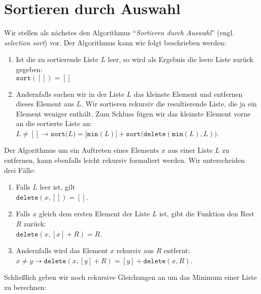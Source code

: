 \section{Sortieren durch Auswahl}
Wir stellen als n\"achstes den Algorithmus ``\emph{Sortieren durch Auswahl}''
(engl. \emph{selection sort}) vor.  Der Algorithmus kann wie folgt beschrieben werden:
\begin{enumerate}
\item Ist die zu sortierende Liste $L$ leer, so wird als Ergebnis
      die leere Liste zur\"uck gegeben: \\[0.2cm]
      \hspace*{1.3cm} $\mathtt{sort}([]) = []$
\item Andernfalls suchen wir in der Liste $L$ das kleinste Element und entfernen dieses
      Element aus $L$.  Wir sortieren rekursiv die resultierende Liste, die ja ein Element
      weniger enth\"alt.  Zum Schluss f\"ugen wir das kleinste Element vorne an die sortierte
      Liste an: \\[0.2cm]
      \hspace*{1.3cm} 
      $L \not= [] \rightarrow \mathtt{sort}\bigl(L\bigr) = \bigl[\texttt{min}(L)\bigr]
      + \mathtt{sort}\bigl(\mathtt{delete}(\texttt{min}(L), L)\bigr)$.
\end{enumerate}
Der Algorithmus um ein Auftreten eines Elements $x$ aus einer Liste $L$ zu entfernen, kann ebenfalls leicht rekursiv
formuliert werden. Wir unterscheiden drei F\"alle:
\begin{enumerate}
\item Falls $L$ leer ist, gilt \\[0.2cm]
      \hspace*{1.3cm} $\mathtt{delete}(x, []) = []$.
\item Falls $x$ gleich dem ersten Element der Liste $L$ ist, gibt die Funktion den Rest
      $R$ zur\"uck: \\[0.2cm]
      \hspace*{1.3cm} 
      $\mathtt{delete}(x, [x] + R) = R$.
\item Andernfalls wird das Element $x$ rekursiv aus $R$ entfernt: \\[0.2cm]
      \hspace*{1.3cm}   
      $x \not = y \rightarrow \mathtt{delete}(x, [y] + R) = [y] + \mathtt{delete}(x,R)$.
\end{enumerate}
Schlie{\ss}lich geben wir noch rekursive Gleichungen an um das Minimum einer Liste zu berechnen:
